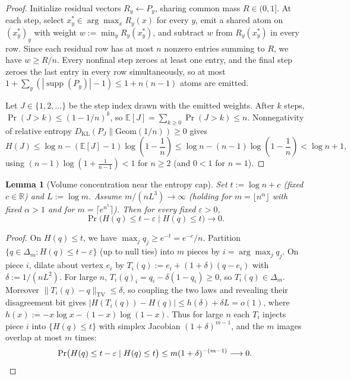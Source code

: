 \documentclass[11pt]{article}
\theoremstyle{plain}
\newtheorem{lemma}[theorem]{Lemma}
\theoremstyle{definition}
\theoremstyle{remark}
\DeclareMathOperator{\supp}{supp}
\begin{document}
\begin{proof}
Initialize residual vectors $R_y \leftarrow P_y$, sharing common mass $R \in (0, 1]$. At each step, select $x_y^* \in \arg\max_x R_y(x)$ for every $y$, emit a shared atom on $(x_y^*)_y$ with weight $w := \min_y R_y(x_y^*)$, and subtract $w$ from $R_y(x_y^*)$ in every row. Since each residual row has at most $n$ nonzero entries summing to $R$, we have $w \ge R/n$. Every nonfinal step zeroes at least one entry, and the final step zeroes the last entry in every row simultaneously, so at most $1 + \sum_y (|\supp(P_y)| - 1) \le 1 + n(n-1)$ atoms are emitted.

Let $J \in \{1, 2, \dots\}$ be the step index drawn with the emitted weights. After $k$ steps, $\Pr(J > k) \le (1 - 1/n)^k$, so $\mathbb{E}[J] = \sum_{k \ge 0} \Pr(J > k) \le n$. Nonnegativity of relative entropy $D_{\mathrm{KL}}(P_J \| \mathrm{Geom}(1/n)) \ge 0$ gives
\[
H(J) \le \log n - (\mathbb{E}[J] - 1)\log\!\left(1 - \frac{1}{n}\right)
\le \log n - (n-1)\log\!\left(1 - \frac{1}{n}\right) < \log n + 1,
\]
using $(n-1)\log(1 + \frac{1}{n-1}) < 1$ for $n \ge 2$ (and $0 < 1$ for $n = 1$).
\end{proof}

\begin{lemma}[Volume concentration near the entropy cap]\label{lem:vol}
Set $t := \log n + c$ (fixed $c \in \mathbb{R}$) and $L := \log m$. Assume $m / (n L^3) \to \infty$ (holding for $m = \lfloor n^\alpha \rfloor$ with fixed $\alpha > 1$ and for $m = \lceil e^{n^5} \rceil$). Then for every fixed $\varepsilon > 0$,
\[
\Pr\bigl(H(q) \le t - \varepsilon \mid H(q) \le t\bigr) \longrightarrow 0.
\]
\end{lemma}

\begin{proof}
On $H(q) \le t$, we have $\max_j q_j \ge e^{-t} = e^{-c}/n$. Partition $\{q \in \Delta_m : H(q) \le t - \varepsilon\}$ (up to null ties) into $m$ pieces by $i = \arg\max_j q_j$. On piece $i$, dilate about vertex $e_i$ by $T_i(q) := e_i + (1 + \delta)(q - e_i)$ with $\delta := 1/(n L^2)$. For large $n$, $T_i(q)_i = q_i - \delta(1 - q_i) \ge 0$, so $T_i(q) \in \Delta_m$. Moreover $\|T_i(q) - q\|_{\mathrm{TV}} \le \delta$, so coupling the two laws and revealing their disagreement bit gives $|H(T_i(q)) - H(q)| \le h(\delta) + \delta L = o(1)$, where $h(x) := -x\log x - (1-x)\log(1-x)$. Thus for large $n$ each $T_i$ injects piece $i$ into $\{H(q) \le t\}$ with simplex Jacobian $(1 + \delta)^{m-1}$, and the $m$ images overlap at most $m$ times:
\[
\Pr\bigl(H(q) \le t - \varepsilon \mid H(q) \le t\bigr)
\le m(1 + \delta)^{-(m-1)} \longrightarrow 0. \qedhere
\]
\end{proof}
\end{document}
